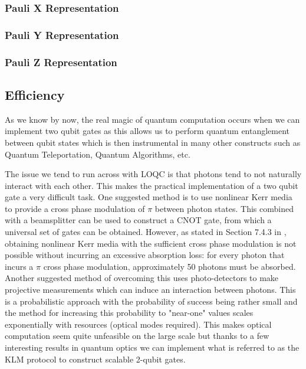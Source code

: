 \subsubsection{Pauli X Representation}
\subsubsection{Pauli Y Representation}
\subsubsection{Pauli Z Representation}


\subsection{Efficiency}
As we know by now, the real magic of quantum computation occurs when we can implement two qubit gates as this allows us to perform quantum entanglement between qubit states which is then instrumental in many other constructs such as Quantum Teleportation, Quantum Algorithms, etc.

The issue we tend to run across with LOQC is that photons tend to not naturally interact with each other. This makes the practical implementation of a two qubit gate a very difficult task. One suggested method is to use nonlinear Kerr media to provide a cross phase modulation of $\pi$ between photon states. This combined with a beamsplitter can be used to construct a CNOT gate, from which a universal set of gates can be obtained. However, as stated in Section 7.4.3 in \cite{nielsen_chuang_2010}, obtaining nonlinear Kerr media with the sufficient cross phase modulation is not possible without incurring an excessive absorption loss: for every photon that incurs a $\pi$ cross phase modulation, approximately 50 photons must be absorbed. Another suggested method of overcoming this uses photo-detectors to make projective measurements which can induce an interaction between photons\cite{Kok:2005jip}. This is a probabilistic approach with the probability of success being rather small and the method for increasing this probability to "near-one" values scales exponentially with resources (optical modes required). This makes optical computation seem quite unfeasible on the large scale but thanks to a few interesting results in quantum optics we can implement what is referred to as the KLM protocol to construct scalable 2-qubit gates.


